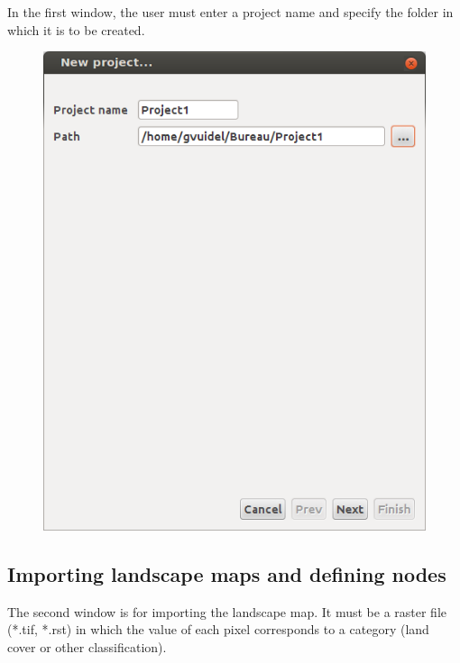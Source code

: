 \documentclass{article}
\begin{document}
In the first window, the user must enter a project name and specify the folder in which it is to be created.

\begin{figure}[H]
	\includegraphics[scale=0.5]{img/manual-en_img2.png}
\end{figure}


\subsection{Importing landscape maps and defining nodes }

The second window is for importing the landscape map. It must be a raster file (*.tif, *.rst) in which the value of each pixel corresponds to a category (land cover or other classification).
\end{document}
